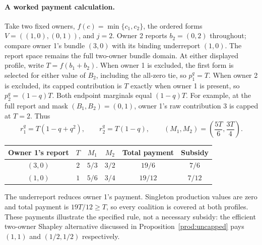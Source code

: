 \paragraph{A worked payment calculation.}
Take two fixed owners, $f(c)=\min\{c_1,c_2\}$, the ordered forms
$V=((1,0),(0,1))$, and $j=2$. Owner 2 reports $b_2=(0,2)$ throughout;
compare owner 1's bundle $(3,0)$ with its binding underreport $(1,0)$.
The report space remains the full two-owner bundle domain. At either displayed
profile, write $T=f(b_1+b_2)$. When owner 1 is excluded, the first form is
selected for either value of $B_2$, including the all-zero tie, so $p_1^q=T$.
When owner 2 is excluded, its capped contribution is $T$ exactly when owner 1
is present, so $p_2^q=(1-q)T$. Both endpoint marginals equal $(1-q)T$.
For example, at the full report and mask $(B_1,B_2)=(0,1)$, owner 1's
raw contribution $3$ is capped at $T=2$. Thus
\[
 r_1^q=T(1-q+q^2),\qquad r_2^q=T(1-q),\qquad
 (M_1,M_2)=\left(\frac{5T}{6},\frac{3T}{4}\right).
\]
\begin{center}
\begin{tabular}{cccccc}
\toprule
Owner 1's report & $T$ & $M_1$ & $M_2$ & Total payment & Subsidy\\
\midrule
$(3,0)$ & $2$ & $5/3$ & $3/2$ & $19/6$ & $7/6$\\
$(1,0)$ & $1$ & $5/6$ & $3/4$ & $19/12$ & $7/12$\\
\bottomrule
\end{tabular}
\end{center}
The underreport reduces owner 1's payment. Singleton production values are
zero and total payment is $19T/12\ge T$, so every coalition is covered at
both profiles. These payments illustrate the specified rule, not a necessary
subsidy: the efficient two-owner Shapley alternative discussed in
Proposition~\ref{prod:uncapped} pays $(1,1)$ and $(1/2,1/2)$ respectively.

